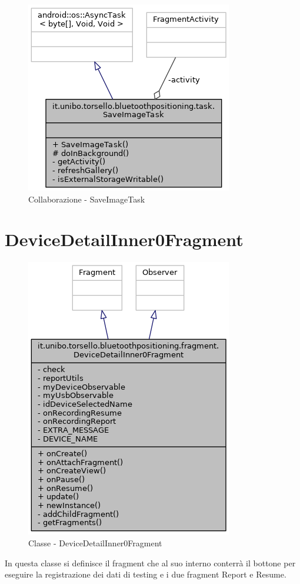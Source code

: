 \begin{figure}[ph]
	\centering
	\includegraphics[width=0.5\linewidth]{img/uml/class/classit_1_1unibo_1_1torsello_1_1bluetoothpositioning_1_1task_1_1SaveImageTask__coll__graph.png}
	\caption{Collaborazione - SaveImageTask}
\end{figure}

\newpage
\section{DeviceDetailInner0Fragment}
\begin{figure}[ph]
	\centering
	\includegraphics[width=0.6\linewidth]{img/uml/class/classit_1_1unibo_1_1torsello_1_1bluetoothpositioning_1_1fragment_1_1DeviceDetailInner0Fragment__inherit__graph.png}
	\caption{Classe - DeviceDetailInner0Fragment}
\end{figure}

In questa classe si definisce il fragment che al suo interno conterrà il bottone per eseguire la registrazione dei dati di testing e i due fragment Report e Resume.

